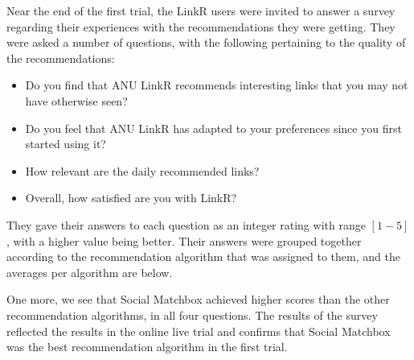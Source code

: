 Near the end of the first trial, the LinkR users were invited to answer a survey regarding their experiences with the recommendations they were getting. They were asked a number of questions, with the following pertaining to the quality of the recommendations:

\begin{itemize}
\item{Do you find that ANU LinkR recommends interesting links that you may not have otherwise seen?}
\item{Do you feel that ANU LinkR has adapted to your preferences since you first started using it?}
\item{How relevant are the daily recommended links?}
\item{Overall, how satisfied are you with LinkR?}
\end{itemize}

They gave their answers to each question as an integer rating with range $[1-5]$, with a higher value being better. Their answers were grouped together according to the recommendation algorithm that was assigned to them, and the averages per algorithm are below.

One more, we see that Social Matchbox achieved higher scores than the other recommendation algorithms, in all four questions. The results of the survey reflected the results in the online live trial and confirms that Social Matchbox was the best recommendation algorithm in the first trial.
 
